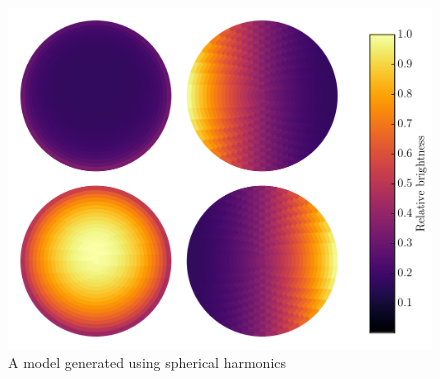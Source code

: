\documentclass[a4paper,fleqn,usenatbib]{mnras}
\begin{document}
\begin{figure}
\begin{center}
\includegraphics[width=\columnwidth]{img/sphere_quad.pdf}
\caption{A model generated using spherical harmonics}
\label{fig:harmonics}
\end{center}
\end{figure}
\end{document}
